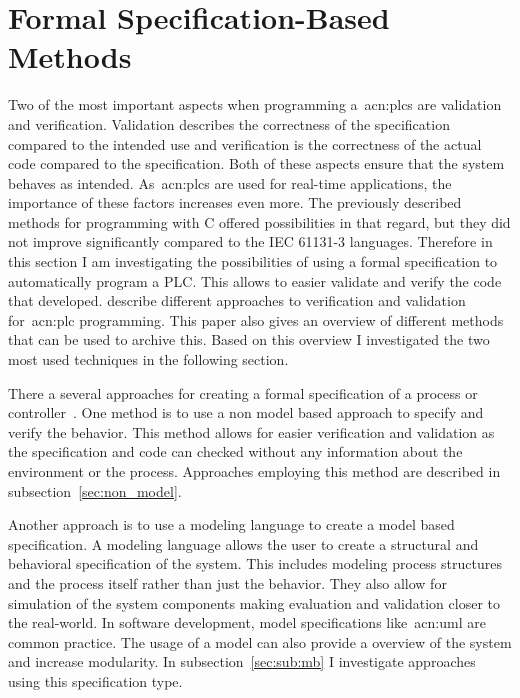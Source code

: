 \chapter{Formal Specification-Based Methods}
\label{sec:formal_methods}

Two of the most important aspects when programming a~\glspl{acn:plc} are validation and verification.
Validation describes the correctness of the specification compared to the intended use and verification is the correctness of the actual code compared to the specification.
Both of these aspects ensure that the system behaves as intended.
As~\glspl{acn:plc} are used for real-time applications, the importance of these factors increases even more.
The previously described methods for programming with C offered possibilities in that regard, but they did not improve significantly compared to the IEC 61131-3 languages.
Therefore in this section I am investigating the possibilities of using a formal specification to automatically program a PLC.
This allows to easier validate and verify the code that developed.
\citeauthor{Frey:2000aa} describe different approaches to verification and validation for~\acrshort{acn:plc} programming.
This paper also gives an overview of different methods that can be used to archive this.
Based on this overview I investigated the two most used techniques in the following section.

There a several approaches for creating a formal specification of a process or controller~\cite{Frey:2000aa}.
One method is to use a non model based approach to specify and verify the behavior.
This method allows for easier verification and validation as the specification and code can checked without any information about the environment or the process.
Approaches employing this method are described in subsection~\ref{sec:non_model}.

Another approach is to use a modeling language to create a model based specification.
A modeling language allows the user to create a structural and behavioral specification of the system.
This includes modeling process structures and the process itself rather than just the behavior.
They also allow for simulation of the system components making evaluation and validation closer to the real-world.
In software development, model specifications like~\acrfull{acn:uml} are common practice.
The usage of a model can also provide a overview of the system and increase modularity.
In subsection~\ref{sec:sub:mb} I investigate approaches using this specification type.

